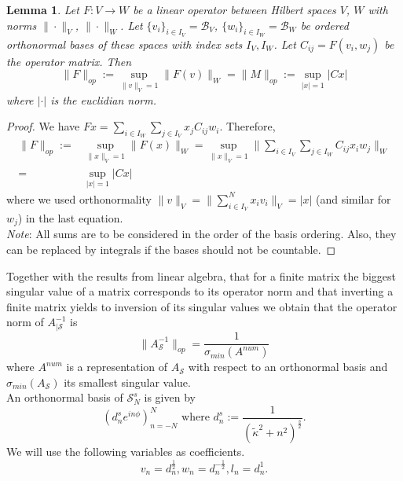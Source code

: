 \documentclass[12pt,journal,compsoc, onecolumn]{IEEEtran}
\newtheorem{lemma}[theorem]{Lemma}
\begin{document}
\begin{lemma}
    Let $F: V \rightarrow W$ be a linear operator between Hilbert spaces $V$, $W$ with norms $\| \cdot \|_V$, $\| \cdot \|_W$. Let $\{v_i\}_{i\in I_{{V}}}= \mathcal{B}_V$, $\{w_i\}_{i\in I_{W}}=\mathcal{B}_W$ be ordered orthonormal bases of these spaces with index sets $I_{{V}}, I_{{W}}$. Let $C_{ij} = F(v_i, w_j)$ be the operator matrix. Then $$\|F\|_{op} := \sup\limits_{\|v\|_{V}=1}\|F(v)\|_{W} = \|M\|_{op} :=  \sup\limits_{|x|=1}|Cx|$$ where $|\cdot|$ is the euclidian norm.
\end{lemma}
\begin{proof}
    We have $F x = \sum\limits_{i\in I_W} \sum\limits_{j \in I_V} x_{j}C_{ij} w_{i}$. Therefore,
    \begin{align}
        \|F\|_{op} := &\sup\limits_{\|x\|_{V}=1}\|F(x)\|_{W} = \sup\limits_{\|x\|_{V}=1}\|\sum\limits_{i\in I_V}\sum\limits_{j\in I_W} C_{ij} x_i w_j\|_{W} \nonumber\\
        =& \sup\limits_{|x|=1}|Cx| \nonumber
    \end{align}
    where we used orthonormality $\|v\|_{V} = \|\sum\limits_{i\in I_V}^N x_i v_i\|_{V} = |x|$ (and similar for $w_j$) in the last equation. 
    \\
    \textit{Note}: All sums are to be considered in the order of the basis ordering. Also, they can be replaced by integrals if the bases should not be countable. 
\end{proof}
\noindent
Together with the results from linear algebra, that for a finite matrix the biggest singular value of a matrix corresponds to its operator norm and that inverting a finite matrix yields to inversion of its singular values we obtain that the operator norm of $A_{|\mathcal{S}}^{-1}$ is $$\|A_{\mathcal{S}}^{-1}\|_{op} = \frac{1}{\sigma_{min}(A^{num})}$$ where $A^{num}$ is a representation of $A_{\mathcal{S}}$ with respect to an orthonormal basis and  $\sigma_{min}(A_{\mathcal{S}})$ its smallest singular value. \\
An orthonormal basis of $\mathcal{S}^s_N$ is given by 
\begin{equation}
    \label{eq:basis}
    \left(d_n^se^{in\phi}\right)_{n = - N}^N \text{ where } d_n^s := \frac{1}{(\tilde\kappa^2 + n^2)^{\frac{s}{2}}}.
\end{equation}
    We will use the following variables as coefficients.
\begin{equation}
    v_{n} = d_n^{\frac{1}{2}}, w_{n} = d_n^{-\frac{1}{2}}, l_n = d_n^{1}.
\end{equation}
\end{document}
